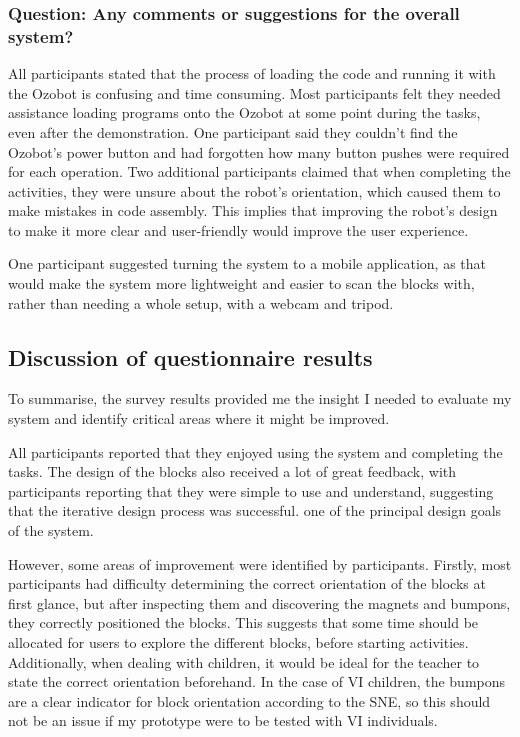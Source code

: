 \documentclass[oneside,%
                    author={Malak Hajji},
                    degree={BSc},
                    title={Designing An Accessible Ozobot Programming Platform for Students},
                  subtitle={With Mixed Visual Abilities}]{dissertation}
\begin{document}
\subsubsection{Question: Any comments or suggestions for the overall system?}
All participants stated that the process of loading the code and running it with the Ozobot is confusing and time consuming. Most participants felt they needed assistance loading programs onto the Ozobot at some point during the tasks, even after the demonstration. One participant said they couldn't find the Ozobot's power button and had forgotten how many button pushes were required for each operation. Two additional participants claimed that when completing the activities, they were unsure about the robot's orientation, which caused them to make mistakes in code assembly. This implies that improving the robot's design to make it more clear and user-friendly would improve the user experience. 

One participant suggested turning the system to a mobile application, as that would make the system more lightweight and easier to scan the blocks with, rather than needing a whole setup, with a webcam and tripod.

\subsection{Discussion of questionnaire results}
To summarise, the survey results provided me the insight I needed to evaluate my system and identify critical areas where it might be improved.

All participants reported that they enjoyed using the system and completing the tasks.  The design of the blocks also received a lot of great feedback, with participants reporting that they were simple to use and understand, suggesting that the iterative design process was successful. one of the principal design goals of the system. 

However, some areas of improvement were identified by participants.
Firstly, most participants had difficulty determining the correct orientation of the blocks at first glance, but after inspecting them and discovering the magnets and bumpons, they correctly positioned the blocks. This suggests that some time should be allocated for users to explore the different blocks, before starting activities. Additionally, when dealing with children, it would be ideal for the teacher to state the correct orientation beforehand. In the case of VI children, the bumpons are a clear indicator for block orientation according to the SNE, so this should not be an issue if my prototype were to be tested with VI individuals.
\end{document}
